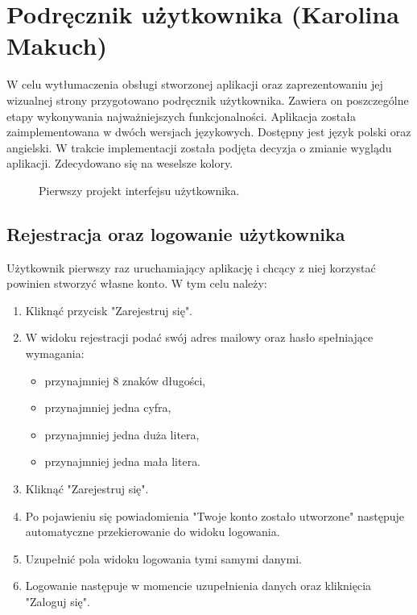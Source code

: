 \chapter{Podręcznik użytkownika (Karolina Makuch)}
\par W celu wytłumaczenia obsługi stworzonej aplikacji oraz zaprezentowaniu jej wizualnej strony przygotowano podręcznik użytkownika. Zawiera on poszczególne etapy wykonywania najważniejszych funkcjonalności.
Aplikacja została zaimplementowana w dwóch wersjach językowych. Dostępny jest język polski oraz angielski.
W trakcie implementacji została podjęta decyzja o zmianie wyglądu aplikacji. Zdecydowano się na weselsze kolory.

\begin{figure}[h]

\centering
\null\hfill
{}
\hfill
{}
\hfill
{}
\hfill\null

\caption{Pierwszy projekt interfejsu użytkownika.}
\label{fig:podrecznik10}
\end{figure}
\FloatBarrier

\section{Rejestracja oraz logowanie użytkownika}
Użytkownik pierwszy raz uruchamiający aplikację i chcący z niej korzystać powinien stworzyć własne konto. W tym celu należy:

\begin{enumerate}
\item Kliknąć przycisk "Zarejestruj się".
\item W widoku rejestracji podać swój adres mailowy oraz hasło spełniające wymagania:
\begin{itemize}
\item przynajmniej 8 znaków długości,
\item przynajmniej jedna cyfra,
\item przynajmniej jedna duża litera,
\item przynajmniej jedna mała litera.
\end{itemize}

\item Kliknąć "Zarejestruj się".
\item Po pojawieniu się powiadomienia "Twoje konto zostało utworzone" następuje automatyczne przekierowanie do widoku logowania.
\item Uzupełnić pola widoku logowania tymi samymi danymi.
\item Logowanie następuje w momencie uzupełnienia danych oraz kliknięcia "Zaloguj się".
\end{enumerate}

